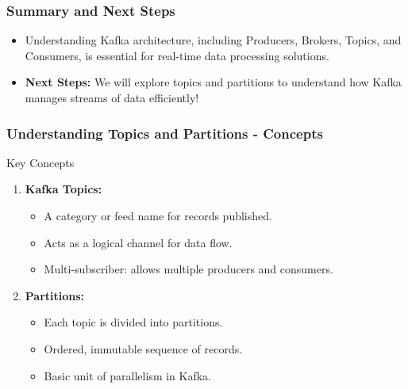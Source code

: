 \documentclass[aspectratio=169]{beamer}
\begin{document}
\begin{frame}[fragile]
    \frametitle{Summary and Next Steps}
    \begin{itemize}
        \item Understanding Kafka architecture, including Producers, Brokers, Topics, and Consumers, is essential for real-time data processing solutions.
        \item \textbf{Next Steps:} We will explore topics and partitions to understand how Kafka manages streams of data efficiently!
    \end{itemize}
\end{frame}

\begin{frame}[fragile]
    \frametitle{Understanding Topics and Partitions - Concepts}
    \begin{block}{Key Concepts}
        \begin{enumerate}
            \item \textbf{Kafka Topics:}
            \begin{itemize}
                \item A category or feed name for records published.
                \item Acts as a logical channel for data flow.
                \item Multi-subscriber: allows multiple producers and consumers.
            \end{itemize}
            \item \textbf{Partitions:}
            \begin{itemize}
                \item Each topic is divided into partitions.
                \item Ordered, immutable sequence of records.
                \item Basic unit of parallelism in Kafka.
            \end{itemize}
        \end{enumerate}
    \end{block}
\end{frame}
\end{document}
